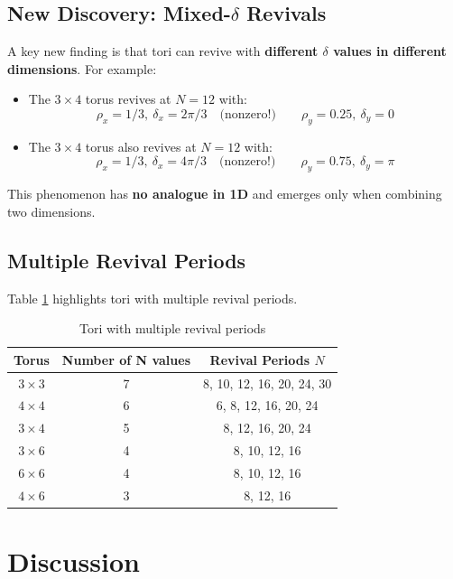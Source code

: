 \documentclass[12pt]{article}
\begin{document}
\subsection{New Discovery: Mixed-\(\delta\) Revivals}

A key new finding is that tori can revive with \textbf{different \(\delta\) values in different dimensions}. For example:

\begin{itemize}
    \item The \(3 \times 4\) torus revives at \(N=12\) with:
    \[
    \rho_x = 1/3,\ \delta_x = 2\pi/3 \quad \text{(nonzero!)} \qquad \rho_y = 0.25,\ \delta_y = 0
    \]
    
    \item The \(3 \times 4\) torus also revives at \(N=12\) with:
    \[
    \rho_x = 1/3,\ \delta_x = 4\pi/3 \quad \text{(nonzero!)} \qquad \rho_y = 0.75,\ \delta_y = \pi
    \]
\end{itemize}

This phenomenon has \textbf{no analogue in 1D} and emerges only when combining two dimensions.

\subsection{Multiple Revival Periods}

Table \ref{tab:multiple_periods} highlights tori with multiple revival periods.

\begin{table}[h!]
\centering
\caption{Tori with multiple revival periods}
\label{tab:multiple_periods}
\begin{tabular}{ccc}
\toprule
\textbf{Torus} & \textbf{Number of N values} & \textbf{Revival Periods \(N\)} \\
\midrule
\(3 \times 3\) & 7 & 8, 10, 12, 16, 20, 24, 30 \\
\(4 \times 4\) & 6 & 6, 8, 12, 16, 20, 24 \\
\(3 \times 4\) & 5 & 8, 12, 16, 20, 24 \\
\(3 \times 6\) & 4 & 8, 10, 12, 16 \\
\(6 \times 6\) & 4 & 8, 10, 12, 16 \\
\(4 \times 6\) & 3 & 8, 12, 16 \\
\bottomrule
\end{tabular}
\end{table}

\section{Discussion}
\end{document}
